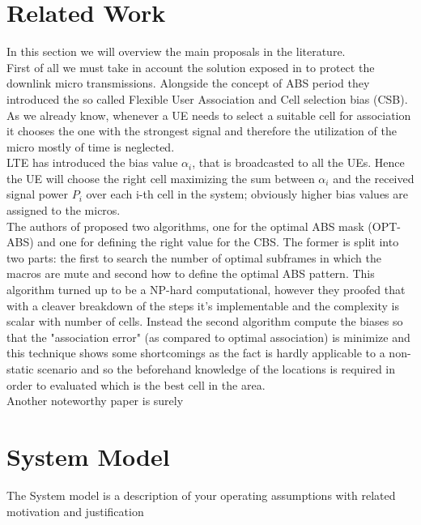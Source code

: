 \documentclass[conference,10pt]{IEEEtran}
\begin{document}
\section{Related Work}\label{sec:sota}
In this section we will overview the main proposals in the literature.\\
First of all we must take in account the solution exposed in \cite{simsek2013enhanced} to protect the downlink micro transmissions. Alongside the concept of ABS period they introduced the so called Flexible User Association and Cell selection bias (CSB). As we already know, whenever a UE needs to select a suitable cell for association it chooses the one with the strongest signal and therefore the utilization of the micro mostly of time is neglected.\\
LTE has introduced the bias value $\alpha_i$, that is broadcasted to all the UEs. Hence the UE will choose the right cell maximizing the sum between $\alpha_i$ and the received signal power $P_i$ over each i-th cell in the system; obviously higher bias values are assigned to the micros.\\
The authors of \cite{deb2014algorithms} proposed two algorithms, one for the optimal ABS mask (OPT-ABS) and one for defining the right value for the CBS. The former is split into two parts: the first to search the number of optimal subframes in which the macros are mute and second how to define the optimal ABS pattern. This algorithm turned up to be a NP-hard computational, however they proofed that with a cleaver breakdown of the steps it's implementable and the complexity is scalar with number of cells. Instead the second algorithm compute the biases so that the "association error" (as compared to optimal association) is minimize and this technique shows some shortcomings as the fact is hardly applicable to a non-static scenario and so the beforehand knowledge of the locations is required in order to evaluated which is the best cell in the area.\\
Another noteworthy paper is surely \cite{deb2014algorithms} 

\section{System Model}\label{sec:symo}
The System model is a description of your operating assumptions with related motivation and justification
\end{document}
